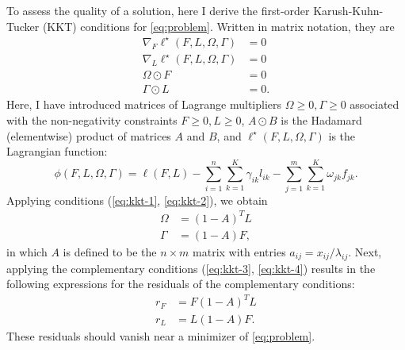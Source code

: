 \documentclass[final]{siamart171218}
\begin{document}
To assess the quality of a solution, here I derive the first-order
Karush-Kuhn-Tucker (KKT) conditions for \eqref{eq:problem}. Written
in matrix notation, they are
\begin{align}
\nabla_F \ell^{\star}(F,L,\Omega,\Gamma) &= 0 \label{eq:kkt-1} \\
\nabla_L \ell^{\star}(F,L,\Omega,\Gamma) &= 0 \label{eq:kkt-2} \\
\Omega \odot F &= 0 \label{eq:kkt-3} \\
\Gamma \odot L &= 0 \label{eq:kkt-4}.
\end{align}
Here, I have introduced matrices of Lagrange multipliers $\Omega \geq
0, \Gamma \geq 0$ associated with the non-negativity constraints $F
\geq 0, L \geq 0$, $A \odot B$ is the Hadamard (elementwise) product
of matrices $A$ and $B$, and $\ell^{\star}(F, L, \Omega, \Gamma)$ is the
Lagrangian function:
\begin{equation}
\phi(F, L, \Omega, \Gamma) = \ell(F,L) 
- \sum_{i=1}^n \sum_{k=1}^K \gamma_{ik} l_{ik}
- \sum_{j=1}^m \sum_{k=1}^K \omega_{jk} f_{jk}.
\end{equation}
Applying conditions (\ref{eq:kkt-1}, \ref{eq:kkt-2}), we obtain
\begin{align}
\Omega &= (1 - A)^TL \\ 
\Gamma &= (1 - A)F,
\end{align}
in which $A$ is defined to be the $n \times m$ matrix with entries
$a_{ij} = x_{ij} / \lambda_{ij}$. Next, applying the complementary
conditions (\ref{eq:kkt-3}, \ref{eq:kkt-4}) results in the following
expressions for the residuals of the complementary conditions:
\begin{align}
r_F &= F(1 - A)^TL \\
r_L &= L(1 - A)F.
\end{align}
These residuals should vanish near a minimizer of \eqref{eq:problem}.



\end{document}
